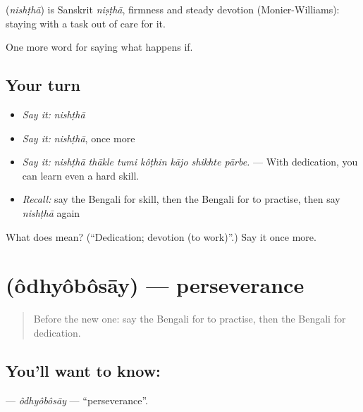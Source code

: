\begin{cousinweb}
\textbf{} (\emph{nishṭhā}) is Sanskrit \emph{niṣṭhā}, firmness and steady devotion (Monier-Williams): staying with a task out of care for it.
\end{cousinweb}

\begin{grammarlens}[title={What you've built}]
One more word for saying what happens if.
\end{grammarlens}

\subsection*{Your turn}
\begin{itemize}
\raggedright
  \item \emph{Say it:} \emph{nishṭhā}
  \item \emph{Say it:} \emph{nishṭhā}, once more
  \item \emph{Say it:} \emph{nishṭhā thākle tumi kôṭhin kājo shikhte pārbe.} — With dedication, you can learn even a hard skill.
  \item \emph{Recall:} say the Bengali for skill, then the Bengali for to practise, then say \emph{nishṭhā} again
\end{itemize}

\begin{tcolorbox}[breakable,colback=teal!4,colframe=teal!35!black,title={Before you move on}]
What does  mean? (\textquotedblleft{}Dedication; devotion (to work)\textquotedblright{}.) Say it once more.
\end{tcolorbox}
\section[\texorpdfstring{\bn{অধ্যবসায়} (ôdhyôbôsāy)}{অধ্যবসায় (ôdhyôbôsāy)}]{ (ôdhyôbôsāy) — perseverance}

\label{lesson:BN-C382-odhyobosay}



\begin{quote}
Before the new one: say the Bengali for to practise, then the Bengali for dedication.
\end{quote}

\subsection*{You'll want to know: }
\textbf{} — \emph{ôdhyôbôsāy} — \textquotedblleft{}perseverance\textquotedblright{}.

